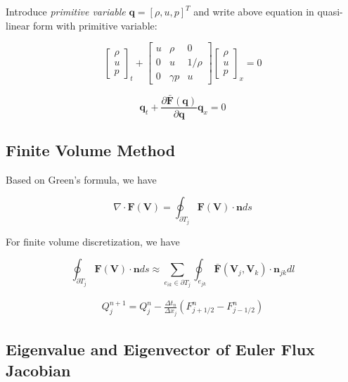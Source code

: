 \documentclass[11pt]{diazessay} %
\begin{document}
Introduce \textit{primitive variable} $\textbf{q} = [\rho, u, p]^{T}$ and write above equation in quasi-linear form with primitive variable:

$$
\begin{bmatrix}
    \rho \\ u\\ p
\end{bmatrix}_t
+
\begin{bmatrix}
    u & \rho & 0\\
    0 & u & 1/\rho\\
    0 & \gamma p & u
\end{bmatrix}
\begin{bmatrix}
    \rho\\ u\\ p
\end{bmatrix}_x
=0
$$

$$
\textbf{q}_t + \frac{\partial \bar{\textbf{F}}(\textbf{q})}{\partial \textbf{q}}\textbf{q}_x= 0
$$


\subsection{Finite Volume Method}
Based on Green's formula, we have

$$
\nabla\cdot \textbf{F}(\textbf{V}) = \oint_{\partial T_j} \textbf{F}(\textbf{V})\cdot \textbf{n} ds
$$

For finite volume discretization, we have\cite{li_multigrid_nodate}

$$
\oint_{\partial T_j} \textbf{F}(\textbf{V})\cdot \textbf{n} ds 
\approx \sum_{e_{ik}\in \partial T_j} \oint_{e_{jk}} \bar{\textbf{F}}(\textbf{V}_j, \textbf{V}_k)\cdot \textbf{n}_{jk} dl
$$


\begin{align}
    Q_j^{n+1} = Q_j^n - \frac{\Delta t_n}{\Delta x_j} (F_{j+1/2}^n - F_{j-1/2}^n)
\end{align}

\subsection{Eigenvalue and Eigenvector of Euler Flux Jacobian}
\end{document}
